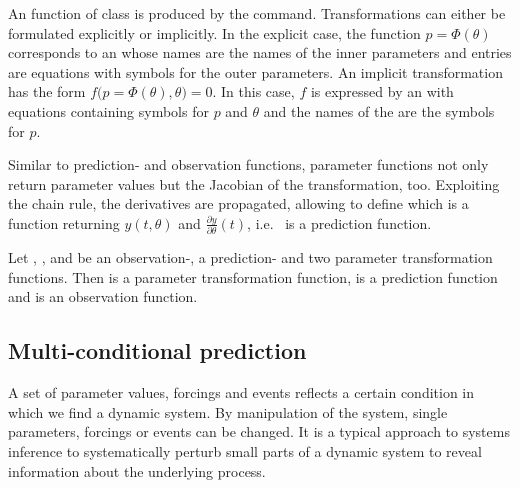 \documentclass[article]{jss}
\begin{document}
An  function of class  is produced by the  command. Transformations can either be formulated explicitly or implicitly. In the explicit case, the function $p = \Phi(\theta)$ corresponds to an  whose names are the names of the inner parameters and entries are equations with symbols for the outer parameters. An implicit transformation has the form $f\big(p = \Phi(\theta), \theta\big) = 0$. In this case, $f$ is expressed by an  with equations containing symbols for $p$ and $\theta$ and the names of the  are the symbols for $p$.

Similar to prediction- and observation functions, parameter functions not only return parameter values but the Jacobian of the transformation, too. Exploiting the chain rule, the derivatives are propagated, allowing to define  which is a function returning $y(t, \theta)$ and $\frac{\partial y}{\partial \theta}(t)$, i.e.~ is a prediction function.

Let , ,  and  be an observation-, a prediction- and two parameter transformation functions. Then  is a parameter transformation function,  is a prediction function and  is an observation function.
 
\subsection{Multi-conditional prediction}

A set of parameter values, forcings and events reflects a certain condition in which we find a dynamic system. By manipulation of the system, single parameters, forcings or events can be changed. It is a typical approach to systems inference to systematically perturb small parts of a dynamic system to reveal information about the underlying process. 
\end{document}
